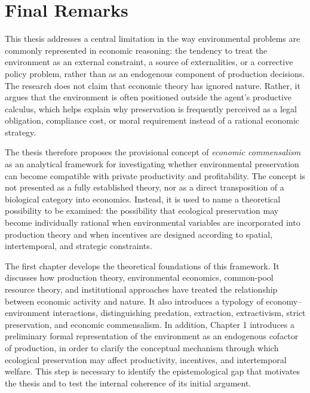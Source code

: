 

\section{Final Remarks}

This thesis addresses a central limitation in the way environmental problems are commonly represented in economic reasoning: the tendency to treat the environment as an external constraint, a source of externalities, or a corrective policy problem, rather than as an endogenous component of production decisions. The research does not claim that economic theory has ignored nature. Rather, it argues that the environment is often positioned outside the agent's productive calculus, which helps explain why preservation is frequently perceived as a legal obligation, compliance cost, or moral requirement instead of a rational economic strategy.

The thesis therefore proposes the provisional concept of \emph{economic commensalism} as an analytical framework for investigating whether environmental preservation can become compatible with private productivity and profitability. The concept is not presented as a fully established theory, nor as a direct transposition of a biological category into economics. Instead, it is used to name a theoretical possibility to be examined: the possibility that ecological preservation may become individually rational when environmental variables are incorporated into production theory and when incentives are designed according to spatial, intertemporal, and strategic constraints.

The first chapter develops the theoretical foundations of this framework. It discusses how production theory, environmental economics, common-pool resource theory, and institutional approaches have treated the relationship between economic activity and nature. It also introduces a typology of economy--environment interactions, distinguishing predation, extraction, extractivism, strict preservation, and economic commensalism. In addition, Chapter 1 introduces a preliminary formal representation of the environment as an endogenous cofactor of production, in order to clarify the conceptual mechanism through which ecological preservation may affect productivity, incentives, and intertemporal welfare. This step is necessary to identify the epistemological gap that motivates the thesis and to test the internal coherence of its initial argument.

